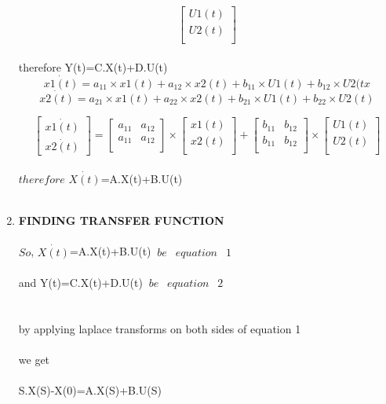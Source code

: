 \documentclass[journal,12pt,twocolumn]{IEEEtran}
\renewcommand\thesection{\arabic{section}}
\begin{document}
\begin{enumerate}[label=\arabic*.,ref=\thesection.\theenumi]
\[\begin{bmatrix}
U1(t)\\
U2(t)\\
\end{bmatrix}
\]
\\therefore Y(t)=C.X(t)+D.U(t)
\begin{equation}
    \dot{x1(t)}=a_{11}\times x1(t)+a_{12}\times x2(t)+b_{11}\times U1(t)+b_{12}\times U2(tx
\end{equation}
\begin{equation}
    \dot{x2(t)}=a_{21}\times x1(t)+a_{22}\times x2(t)+b_{21}\times U1(t)+b_{22}\times U2(t)
\end{equation}

\[
\begin{bmatrix}
\dot{x1(t)}\\
\dot{x2(t)}
\end{bmatrix}
=
\begin{bmatrix}
a_{11}&a_{12}\\
a_{11}&a_{12}\\
\end{bmatrix}\times \begin{bmatrix}
x1(t)\\
x2(t)\\
\end{bmatrix}
+
\begin{bmatrix}
b_{11}&b_{12}\\
b_{11}&b_{12}\\
\end{bmatrix} \times\begin{bmatrix}
U1(t)\\
U2(t)\\
\end{bmatrix}
\]
\\$therefore$  $\dot{X(t)}$=A.X(t)+B.U(t)
\\
\\\item \textbf{FINDING TRANSFER FUNCTION}
\\
\\ $So$, $\dot{X(t)}$=A.X(t)+B.U(t) $~be~$ $~equation~$ $~1~$
\\
\\ and  Y(t)=C.X(t)+D.U(t)        $~be~$ $~equation~$ $~2~$
\\
\\
\\ by applying laplace transforms on both sides of equation 1
\\
\\ we get
\\
\\S.X(S)-X(0)=A.X(S)+B.U(S)

\end{enumerate}
\end{document}
